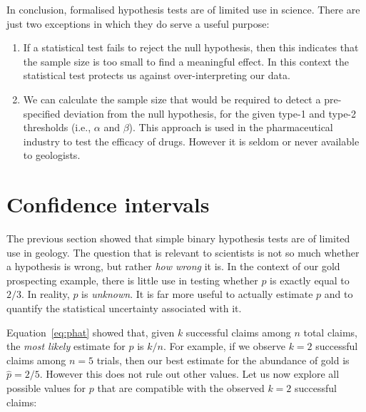 In conclusion, formalised hypothesis tests are of limited use in
science.  There are just two exceptions in which they do serve a
useful purpose:

\begin{enumerate}
\item If a statistical test fails to reject the null hypothesis, then
  this indicates that the sample size is too small to find a
  meaningful effect. In this context the statistical test protects us
  against over-interpreting our data.
\item We can calculate the sample size that would be required to
  detect a pre-specified deviation from the null hypothesis, for the
  given type-1 and type-2 thresholds (i.e., $\alpha$ and $\beta$).
  This approach is used in the pharmaceutical industry to test the
  efficacy of drugs. However it is seldom or never available to
  geologists.
\end{enumerate}

\section{Confidence intervals}
\label{sec:binomCI}

The previous section showed that simple binary hypothesis tests are of
limited use in geology. The question that is relevant to scientists is
not so much whether a hypothesis is wrong, but rather \emph{how wrong}
it is. In the context of our gold prospecting example, there is little
use in testing whether $p$ is exactly equal to $2/3$. In reality, $p$
is \emph{unknown}. It is far more useful to actually estimate $p$ and
to quantify the statistical uncertainty associated with it.\medskip

Equation~\ref{eq:phat} showed that, given $k$ successful claims among
$n$ total claims, the \emph{most likely} estimate for $p$ is $k/n$.
For example, if we observe $k=2$ successful claims among $n=5$ trials,
then our best estimate for the abundance of gold is $\hat{p}=2/5$.
However this does not rule out other values. Let us now explore all
possible values for $p$ that are compatible with the observed $k=2$
successful claims:

